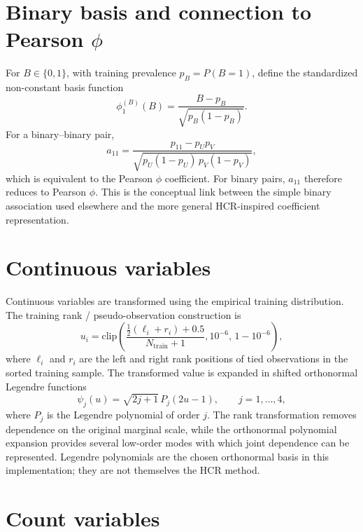 \section{Binary basis and connection to Pearson $\phi$}
\label{app:hcr-binary}

For $B\in\{0,1\}$, with training prevalence $p_{B}=P(B=1)$, define the standardized non-constant basis function
\begin{equation}
\label{eq:app-phi-binary}
\phi^{(B)}_{1}(B)
=
\frac{B-p_{B}}{\sqrt{p_{B}(1-p_{B})}}.
\end{equation}
For a binary--binary pair,
\begin{equation}
\label{eq:app-a11-phi}
a_{11}
=
\frac{p_{11}-p_{U}p_{V}}{\sqrt{p_{U}(1-p_{U})\,p_{V}(1-p_{V})}},
\end{equation}
which is equivalent to the Pearson $\phi$ coefficient.
For binary pairs, $a_{11}$ therefore reduces to Pearson $\phi$.
This is the conceptual link between the simple binary association used elsewhere and the more general HCR-inspired coefficient representation.

\section{Continuous variables}
\label{app:hcr-continuous}

Continuous variables are transformed using the empirical training distribution.
The training rank / pseudo-observation construction is
\begin{equation}
\label{eq:app-ecdf}
u_{i}
=
\mathrm{clip}\!\left(
\frac{\tfrac{1}{2}(\ell_{i}+r_{i})+0.5}{N_{\mathrm{train}}+1},
10^{-6},\,1-10^{-6}
\right),
\end{equation}
where $\ell_{i}$ and $r_{i}$ are the left and right rank positions of tied observations in the sorted training sample.
The transformed value is expanded in shifted orthonormal Legendre functions
\begin{equation}
\label{eq:app-legendre}
\psi_{j}(u)=\sqrt{2j+1}\,P_{j}(2u-1),\qquad j=1,\ldots,4,
\end{equation}
where $P_{j}$ is the Legendre polynomial of order $j$.
The rank transformation removes dependence on the original marginal scale, while the orthonormal polynomial expansion provides several low-order modes with which joint dependence can be represented.
Legendre polynomials are the chosen orthonormal basis in this implementation; they are not themselves the HCR method.

\section{Count variables}
\label{app:hcr-count}

